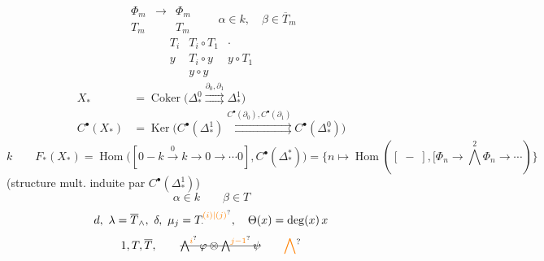 \[
 \begin{array}{ccc}\Phi_m&\longrightarrow&\Phi_m\\ T_m&&T_m\end{array}
 \qquad \alpha\in k,\quad\beta\in\overline{T}_m
\]
\[
 \begin{array}{ccc}
 T_i&T_i\circ T_1&\cdot\\ y&T_i\circ y&y\circ T_1\\ &y\circ y&
 \end{array}
\]
\[
 \begin{aligned}
 X_*&=\operatorname{Coker}\bigl(\Delta^0_*\overset{\partial_0,\partial_1}{\rightrightarrows}\Delta^1_*\bigr)\\
 C^\bullet(X_*)&=\operatorname{Ker}\bigl(C^\bullet(\Delta^1_*)
 \overset{C^\bullet(\partial_0),C^\bullet(\partial_1)}{\rightrightarrows} C^\bullet(\Delta^0_*)\bigr)
 \end{aligned}
\]
\[
 k\qquad F_*(X_*)=\operatorname{Hom}\bigl(
 [0-k\xrightarrow{0}k\longrightarrow 0\longrightarrow\cdots0],
 C^\bullet(\Delta^*_*))=
 \bigl\{n\longmapsto\operatorname{Hom}([\;-\;],
 [\Phi_n\longrightarrow\bigwedge^2\Phi_n\longrightarrow\cdots)\bigr\}
\]
(structure mult. induite par \(C^\bullet(\Delta^1_*)\))
\[
 \alpha\in k\qquad \beta\in T
\]
\[
 d,\ \lambda=\overline T_{\wedge},\ \delta,\ \mu_j=T_{\cdot}^{\unsure{(i)|(j)}},\quad
 \Theta(x)=\deg(x)\,x
\]
\[
 1,T,\overline T,\qquad
 \deleted{\bigwedge^{\unsure{i}}\varphi\otimes\bigwedge^{\unsure{j-1}}\psi}
 \qquad\unsure{\bigwedge}
\]
